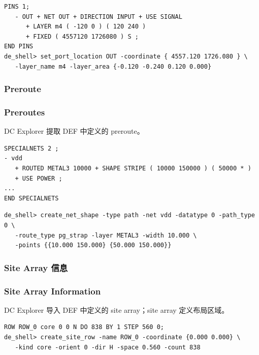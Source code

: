 \begin{lstlisting}[caption={带方向的端口 DEF 与 Tcl},label={ex:dce-port-orient}]
PINS 1;
   - OUT + NET OUT + DIRECTION INPUT + USE SIGNAL
      + LAYER m4 ( -120 0 ) ( 120 240 )
      + FIXED ( 4557120 1726080 ) S ;
END PINS
de_shell> set_port_location OUT -coordinate { 4557.120 1726.080 } \
   -layer_name m4 -layer_area {-0.120 -0.240 0.120 0.000}
\end{lstlisting}

\subsubsection{Preroute}
\subsubsection*{Preroutes}

DC Explorer 提取 DEF 中定义的 preroute。

\begin{lstlisting}[caption={导入的 preroute},label={ex:dce-preroute-def}]
SPECIALNETS 2 ;
- vdd
   + ROUTED METAL3 10000 + SHAPE STRIPE ( 10000 150000 ) ( 50000 * )
   + USE POWER ;
...
END SPECIALNETS
\end{lstlisting}

\begin{lstlisting}[caption={等价 Tcl},label={ex:dce-preroute-tcl}]
de_shell> create_net_shape -type path -net vdd -datatype 0 -path_type 0 \
   -route_type pg_strap -layer METAL3 -width 10.000 \
   -points {{10.000 150.000} {50.000 150.000}}
\end{lstlisting}

\subsubsection{Site Array 信息}
\subsubsection*{Site Array Information}

DC Explorer 导入 DEF 中定义的 site array；site array 定义布局区域。

\begin{lstlisting}[caption={Site array DEF 与等价 Tcl},label={ex:dce-site}]
ROW ROW_0 core 0 0 N DO 838 BY 1 STEP 560 0;
de_shell> create_site_row -name ROW_0 -coordinate {0.000 0.000} \
   -kind core -orient 0 -dir H -space 0.560 -count 838
\end{lstlisting}

